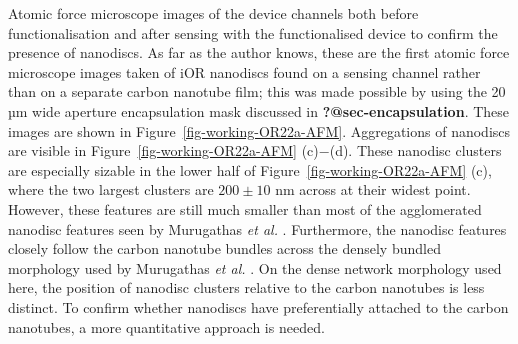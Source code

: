 \documentclass[
  a4paper,
]{scrbook}
\begin{document}
Atomic force microscope images of the device channels both before
functionalisation and after sensing with the functionalised device to
confirm the presence of nanodiscs. As far as the author knows, these are
the first atomic force microscope images taken of iOR nanodiscs found on
a sensing channel rather than on a separate carbon nanotube film; this
was made possible by using the 20 µm wide aperture encapsulation mask
discussed in \textbf{?@sec-encapsulation}. These images are shown in
Figure~\ref{fig-working-OR22a-AFM}. Aggregations of nanodiscs are
visible in Figure~\ref{fig-working-OR22a-AFM} (c)\(-\)(d). These
nanodisc clusters are especially sizable in the lower half of
Figure~\ref{fig-working-OR22a-AFM} (c), where the two largest clusters
are \(200\pm10\) nm across at their widest point. However, these
features are still much smaller than most of the agglomerated nanodisc
features seen by Murugathas \emph{et al.} \autocite{Murugathas2019b}.
Furthermore, the nanodisc features closely follow the carbon nanotube
bundles across the densely bundled morphology used by Murugathas
\emph{et al.} \autocite{Murugathas2019b}. On the dense network
morphology used here, the position of nanodisc clusters relative to the
carbon nanotubes is less distinct. To confirm whether nanodiscs have
preferentially attached to the carbon nanotubes, a more quantitative
approach is needed.
\end{document}
